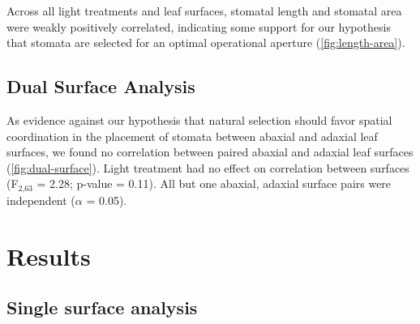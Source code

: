 \documentclass[12pt,halfline,a4paper,]{ouparticle}
\begin{document}
Across all light treatments and leaf surfaces, stomatal length and
stomatal area were weakly positively correlated, indicating some support
for our hypothesis that stomata are selected for an optimal operational
aperture (\autoref{fig:length-area}).

\hypertarget{dual-surface-analysis}{%
\subsection{Dual Surface Analysis}\label{dual-surface-analysis}}

As evidence against our hypothesis that natural selection should favor
spatial coordination in the placement of stomata between abaxial and
adaxial leaf surfaces, we found no correlation between paired abaxial
and adaxial leaf surfaces (\autoref{fig:dual-surface}). Light treatment
had no effect on correlation between surfaces (F\(_\text{2,63}\) = 2.28;
p-value = 0.11). All but one abaxial, adaxial surface pairs were
independent (\(\alpha\) = 0.05).

\hypertarget{results-1}{%
\section{Results}\label{results-1}}

\hypertarget{single-surface-analysis}{%
\subsection{Single surface analysis}\label{single-surface-analysis}}
\end{document}
